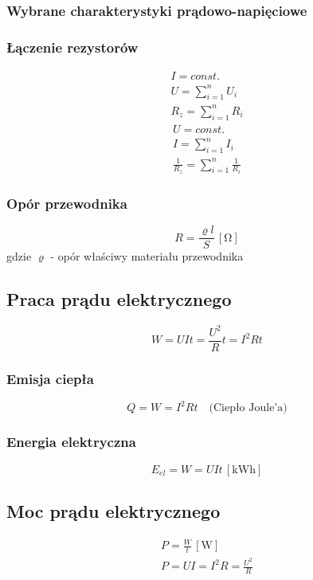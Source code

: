 \documentclass{article}
\numberwithin{equation}{section}
\newcommand{\unit}[1]{\, \left[\mathrm{#1}\right]}
\begin{document}
      \subsubsection{Wybrane charakterystyki prądowo-napięciowe}
      \subsubsection{Łączenie rezystorów}
        \begin{gather}
          I = const.\\
          U = \sum_{i=1}^n U_i\\
          R_z = \sum_{i=1}^n R_i
        \end{gather}
        \begin{gather}
          U = const.\\
          I = \sum_{i=1}^n I_i\\
          \frac{1}{R_z} = \sum_{i=1}^n \frac{1}{R_i}
        \end{gather}
      \subsubsection{Opór przewodnika}
        \begin{equation}
          R = \frac{\varrho l}{S} \unit{\Omega}
        \end{equation}
      gdzie $\varrho$ - opór właściwy materiału przewodnika
    \subsection{Praca prądu elektrycznego}
      \begin{equation}
        W = UIt = \frac{U^2}{R}t = I^2Rt
      \end{equation}
      \subsubsection{Emisja ciepła}
        \begin{equation}
          Q = W = I^2Rt \quad\text{(Ciepło Joule'a)}
        \end{equation}
      \subsubsection{Energia elektryczna}
        \begin{equation}
          E_{el} = W = UIt \unit{kWh}
        \end{equation}
    \subsection{Moc prądu elektrycznego}
      \begin{gather}
        P = \frac{W}{t} \unit{W}\\
        P = UI = I^2R = \frac{U^2}{R}
      \end{gather}
\end{document}
